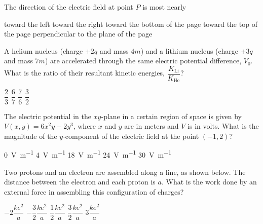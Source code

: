 \documentclass[12pt]{../oss-classkick-exam}
\begin{document}
\begin{questions}
  \question The direction of the electric field at point $P$ is most nearly
  \label{contour2}
  \begin{choices}
    \choice toward the left
    \choice toward the right
    \choice toward the bottom of the page
    \choice toward the top of the page
    \choice perpendicular to the plane of the page
  \end{choices}

  \uplevel{ \rule{\linewidth}{.5pt}}
  
  \question A helium nucleus (charge $+2q$ and mass $4m$) and a lithium nucleus
  (charge $+3q$ and mass $7m$) are accelerated through the same electric
  potential difference, $V_0$. What is the ratio of their resultant
  kinetic energies, $\dfrac{K_\text{Li}}{K_\text{He}}$?
  \begin{choices}
    \choice$\dfrac23$
    \choice$\dfrac67$
    \choice$\dfrac76$
    \choice$\dfrac32$
  \end{choices}
  \newpage
  
  \question The electric potential in the $xy$-plane in a certain region of
  space is given by $V(x,y)=6x^2y-2y^3$, where $x$ and $y$ are in meters and
  $V$ is in volts. What is the magnitude of the $y$-component of the electric
  field at the point $(-1,2)$?
  \begin{choices}
    \choice\SI{0}{\volt\per\metre}
    \choice\SI{4}{\volt\per\metre}
    \choice\SI{18}{\volt\per\metre}
    \choice\SI{24}{\volt\per\metre}
    \choice\SI{30}{\volt\per\metre}
  \end{choices}

  \uplevel{ \rule{\linewidth}{.5pt}}
  

  \question Two protons and an electron are assembled along a line, as shown
  below. The distance between the electron and each proton is $a$. What is the
  work done by an external force in assembling this configuration of charges?
  \begin{choices}
    \choice $-2\dfrac{ke^2}a$
    \choice $-\dfrac32\dfrac{ke^2}a$
    \choice $\dfrac12\dfrac{ke^2}a$
    \choice $\dfrac32\dfrac{ke^2}a$
    \choice $3\dfrac{ke^2}a$
  \end{choices}


\end{questions}
\end{document}

